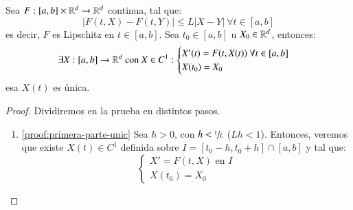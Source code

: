 \begin{thm}
    Sea $F: [a, b] \times \mathbb{R}^d \to \mathbb{R}^d$ continua, tal que:
    $$
        |F(t, X) - F(t, Y)| \leq L|X - Y|\ \forall t \in [a, b]
    $$
    es decir, $F$ es Lipschitz en $t\in[a, b]$. Sea $t_0 \in [a, b]$ u $X_0 \in \mathbb{R}^d$, entonces:
    $$
        \exists X:[a, b] \to \mathbb{R}^d \text{ con } X\in C^1 : \begin{cases}
            X'(t) = F(t, X(t))\ \forall t\in [a, b]\\
            X(t_0) = X_0
        \end{cases}
    $$ esa $X(t)$ es única.
\end{thm}
\begin{proof}
    Dividiremos en la prueba en distintos pasos.\\
    \begin{enumerate}
        \item \ref{proof:primera-parte-unic} Sea $h>0$, con $h < \sfrac{1}{L}$ ($Lh < 1$). Entonces, veremos que existe $X(t) \in C^1$ definida sobre $I = [t_0-h, t_0+h]\cap[a, b]$ y tal que:
        $$
            \begin{cases}
                X' = F(t, X) \text{ en } I\\
                X(t_0) = X_0
            \end{cases}
        $$


\end{enumerate}
\end{proof}
